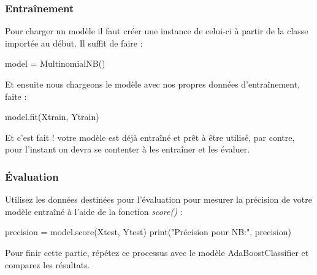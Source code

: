 \subsubsection{Entraînement}
Pour charger un modèle il faut créer une instance de celui-ci à partir de la classe importée au début. Il suffit de faire :

\begin{python}
	model = MultinomialNB()
\end{python}

Et ensuite nous chargeons le modèle avec nos propres données d'entraînement, faite :
\begin{python}
	model.fit(Xtrain, Ytrain)
\end{python}

Et c'est fait ! votre modèle est déjà entraîné et prêt à être utilisé, par contre, pour l'instant on devra se contenter à les entraîner et les évaluer.
\subsubsection{Évaluation}
Utilisez les données destinées pour l'évaluation pour mesurer la précision de votre modèle entraîné à l'aide de la fonction \textit{score()} :

\begin{python}
	precision = model.score(Xtest, Ytest)
	print("Précision pour NB:", precision)

\end{python}

Pour finir cette partie, répétez ce processus avec le modèle AdaBoostClassifier et comparez les résultats.